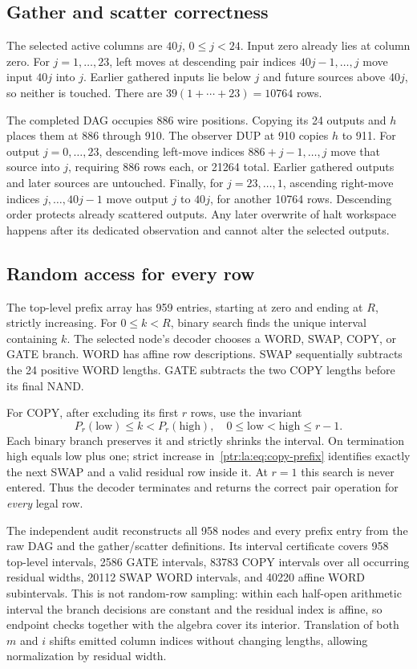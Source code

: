 \documentclass[11pt,letterpaper]{article}
\theoremstyle{definition}\newtheorem{definition}[theorem]{Definition}
\theoremstyle{remark}\newtheorem{remark}[theorem]{Remark}
\begin{document}
\subsection{Gather and scatter correctness}
The selected active columns are $40j$, $0\le j<24$. Input zero already lies at column zero. For $j=1,\ldots,23$, left moves at descending pair indices $40j-1,\ldots,j$ move input $40j$ into $j$. Earlier gathered inputs lie below $j$ and future sources above $40j$, so neither is touched. There are $39(1+\cdots+23)=10764$ rows.

The completed DAG occupies 886 wire positions. Copying its 24 outputs and $h$ places them at 886 through 910. The observer DUP at 910 copies $h$ to 911. For output $j=0,\ldots,23$, descending left-move indices $886+j-1,\ldots,j$ move that source into $j$, requiring 886 rows each, or 21264 total. Earlier gathered outputs and later sources are untouched. Finally, for $j=23,\ldots,1$, ascending right-move indices $j,\ldots,40j-1$ move output $j$ to $40j$, for another 10764 rows. Descending order protects already scattered outputs. Any later overwrite of halt workspace happens after its dedicated observation and cannot alter the selected outputs.

\subsection{Random access for every row}
The top-level prefix array has 959 entries, starting at zero and ending at $R$, strictly increasing. For $0\le k<R$, binary search finds the unique interval containing $k$. The selected node's decoder chooses a WORD, SWAP, COPY, or GATE branch. WORD has affine row descriptions. SWAP sequentially subtracts the 24 positive WORD lengths. GATE subtracts the two COPY lengths before its final NAND.

For COPY, after excluding its first $r$ rows, use the invariant
\[
 P_r(\mathrm{low})\le k<P_r(\mathrm{high}),\quad
 0\le\mathrm{low}<\mathrm{high}\le r-1.
\]
Each binary branch preserves it and strictly shrinks the interval. On termination high equals low plus one; strict increase in~\eqref{ptr:la:eq:copy-prefix} identifies exactly the next SWAP and a valid residual row inside it. At $r=1$ this search is never entered. Thus the decoder terminates and returns the correct pair operation for \emph{every} legal row.

The independent audit reconstructs all 958 nodes and every prefix entry from the raw DAG and the gather/scatter definitions. Its interval certificate covers 958 top-level intervals, 2586 GATE intervals, 83783 COPY intervals over all occurring residual widths, 20112 SWAP WORD intervals, and 40220 affine WORD subintervals. This is not random-row sampling: within each half-open arithmetic interval the branch decisions are constant and the residual index is affine, so endpoint checks together with the algebra cover its interior. Translation of both $m$ and $i$ shifts emitted column indices without changing lengths, allowing normalization by residual width.
\end{document}
